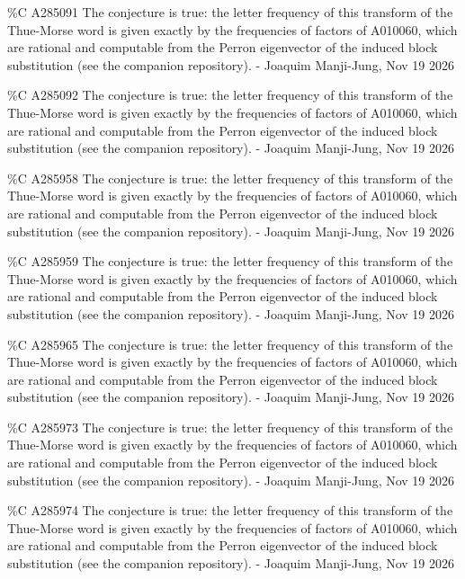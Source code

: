 {\%C A285091 The conjecture is true: the letter frequency of this transform of the Thue-Morse word is given exactly by the frequencies of factors of A010060, which are rational and computable from the Perron eigenvector of the induced block substitution (see the companion repository). - Joaquim Manji-Jung, Nov 19 2026\par
\%C A285092 The conjecture is true: the letter frequency of this transform of the Thue-Morse word is given exactly by the frequencies of factors of A010060, which are rational and computable from the Perron eigenvector of the induced block substitution (see the companion repository). - Joaquim Manji-Jung, Nov 19 2026\par
\%C A285958 The conjecture is true: the letter frequency of this transform of the Thue-Morse word is given exactly by the frequencies of factors of A010060, which are rational and computable from the Perron eigenvector of the induced block substitution (see the companion repository). - Joaquim Manji-Jung, Nov 19 2026\par
\%C A285959 The conjecture is true: the letter frequency of this transform of the Thue-Morse word is given exactly by the frequencies of factors of A010060, which are rational and computable from the Perron eigenvector of the induced block substitution (see the companion repository). - Joaquim Manji-Jung, Nov 19 2026\par
\%C A285965 The conjecture is true: the letter frequency of this transform of the Thue-Morse word is given exactly by the frequencies of factors of A010060, which are rational and computable from the Perron eigenvector of the induced block substitution (see the companion repository). - Joaquim Manji-Jung, Nov 19 2026\par
\%C A285973 The conjecture is true: the letter frequency of this transform of the Thue-Morse word is given exactly by the frequencies of factors of A010060, which are rational and computable from the Perron eigenvector of the induced block substitution (see the companion repository). - Joaquim Manji-Jung, Nov 19 2026\par
\%C A285974 The conjecture is true: the letter frequency of this transform of the Thue-Morse word is given exactly by the frequencies of factors of A010060, which are rational and computable from the Perron eigenvector of the induced block substitution (see the companion repository). - Joaquim Manji-Jung, Nov 19 2026\par
}
